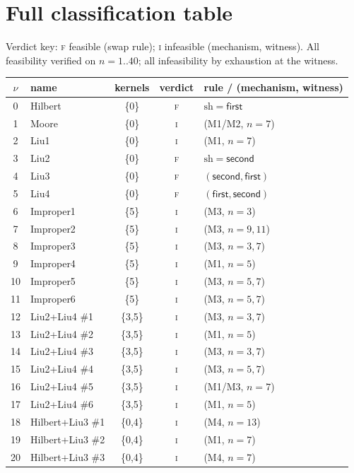 \documentclass[11pt]{article}
\theoremstyle{definition}
\begin{document}
\section{Full classification table}\label{tab:class}
Verdict key: \textsc{f} feasible (swap rule); \textsc{i} infeasible (mechanism, witness).
All feasibility verified on $n=1..40$; all infeasibility by exhaustion at the witness.
{\small
\begin{longtable}{clccl}
\toprule
$\nu$ & name & kernels & verdict & rule / (mechanism, witness)\\
\midrule\endhead
0 & Hilbert & \{0\} & \textsc{f} & $\mathrm{sh}=\textsf{first}$\\
1 & Moore & \{0\} & \textsc{i} & (M1/M2, $n{=}7$)\\
2 & Liu1 & \{0\} & \textsc{i} & (M1, $n{=}7$)\\
3 & Liu2 & \{0\} & \textsc{f} & $\mathrm{sh}=\textsf{second}$\\
4 & Liu3 & \{0\} & \textsc{f} & $(\textsf{second},\textsf{first})$\\
5 & Liu4 & \{0\} & \textsc{f} & $(\textsf{first},\textsf{second})$\\
6 & Improper1 & \{5\} & \textsc{i} & (M3, $n{=}3$)\\
7 & Improper2 & \{5\} & \textsc{i} & (M3, $n{=}9,11$)\\
8 & Improper3 & \{5\} & \textsc{i} & (M3, $n{=}3,7$)\\
9 & Improper4 & \{5\} & \textsc{i} & (M1, $n{=}5$)\\
10 & Improper5 & \{5\} & \textsc{i} & (M3, $n{=}5,7$)\\
11 & Improper6 & \{5\} & \textsc{i} & (M3, $n{=}5,7$)\\
12 & Liu2+Liu4 \#1 & \{3,5\} & \textsc{i} & (M3, $n{=}3,7$)\\
13 & Liu2+Liu4 \#2 & \{3,5\} & \textsc{i} & (M1, $n{=}5$)\\
14 & Liu2+Liu4 \#3 & \{3,5\} & \textsc{i} & (M3, $n{=}3,7$)\\
15 & Liu2+Liu4 \#4 & \{3,5\} & \textsc{i} & (M3, $n{=}5,7$)\\
16 & Liu2+Liu4 \#5 & \{3,5\} & \textsc{i} & (M1/M3, $n{=}7$)\\
17 & Liu2+Liu4 \#6 & \{3,5\} & \textsc{i} & (M1, $n{=}5$)\\
18 & Hilbert+Liu3 \#1 & \{0,4\} & \textsc{i} & (M4, $n{=}13$)\\
19 & Hilbert+Liu3 \#2 & \{0,4\} & \textsc{i} & (M1, $n{=}7$)\\
20 & Hilbert+Liu3 \#3 & \{0,4\} & \textsc{i} & (M4, $n{=}7$)\\

\end{longtable}}
\end{document}
